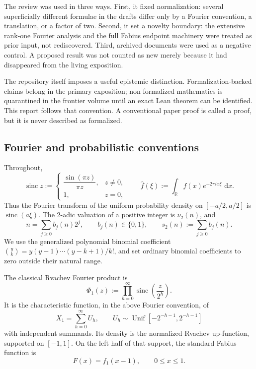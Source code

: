 \documentclass[11pt,a4paper]{article}
\theoremstyle{frontier}
\theoremstyle{definition}
\newcommand{\sinc}{\operatorname{sinc}}
\newcommand{\R}{\mathbb R}
\newcommand{\dd}{\,\mathrm d}
\begin{document}
The review was used in three ways.  First, it fixed normalization: several superficially different formulae in the drafts differ only by a Fourier convention, a translation, or a factor of two.  Second, it set a novelty boundary: the extensive rank-one Fourier analysis and the full Fabius endpoint machinery were treated as prior input, not rediscovered.  Third, archived documents were used as a negative control.  A proposed result was not counted as new merely because it had disappeared from the living exposition.

The repository itself imposes a useful epistemic distinction.  Formalization-backed claims belong in the primary exposition; non-formalized mathematics is quarantined in the frontier volume until an exact Lean theorem can be identified.  This report follows that convention.  A conventional paper proof is called a proof, but it is never described as formalized.

\subsection{Fourier and probabilistic conventions}

Throughout,
\[
  \sinc z:=\begin{cases}
  \dfrac{\sin(\pi z)}{\pi z},&z\ne0,\\[0.4em]
  1,&z=0,
  \end{cases}
  \qquad
  \widehat f(\xi):=\int_{\R}f(x)e^{-2\pi i x\xi}\,\dd x.
\]
Thus the Fourier transform of the uniform probability density on $[-a/2,a/2]$ is $\sinc(a\xi)$.  The $2$-adic valuation of a positive integer is $\nu_2(n)$, and
\[
  n=\sum_{j\ge0}b_j(n)2^j,
  \qquad b_j(n)\in\{0,1\},
  \qquad s_2(n):=\sum_{j\ge0}b_j(n).
\]
We use the generalized polynomial binomial coefficient $\binom yk=y(y-1)\cdots(y-k+1)/k!$, and set ordinary binomial coefficients to zero outside their natural range.

The classical Rvachev Fourier product is
\begin{equation}\label{eq:phi1}
  \Phi_1(z):=\prod_{h=0}^{\infty}\sinc\!\left(\frac z{2^h}\right).
\end{equation}
It is the characteristic function, in the above Fourier convention, of
\begin{equation}\label{eq:X1}
  X_1=\sum_{h=0}^{\infty}U_h,
  \qquad U_h\sim\operatorname{Unif}\!\left[-2^{-h-1},2^{-h-1}\right]
\end{equation}
with independent summands.  Its density is the normalized Rvachev up-function, supported on $[-1,1]$.  On the left half of that support, the standard Fabius function is
\begin{equation}\label{eq:fabius-shift}
  F(x)=f_1(x-1),\qquad 0\le x\le1.
\end{equation}
\end{document}
